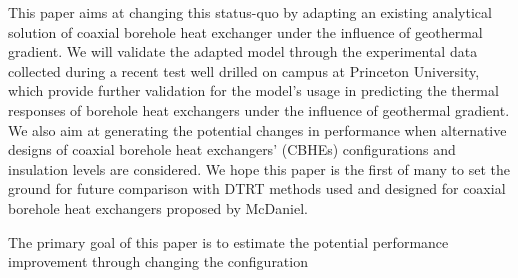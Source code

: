 This paper aims at changing this status-quo by adapting an existing analytical solution of coaxial borehole heat exchanger under the influence of geothermal gradient. We will validate the adapted model through the experimental data collected during a recent test well drilled on campus at Princeton University, which provide further validation for the model's usage in predicting the thermal responses of borehole heat exchangers under the influence of geothermal gradient. %
We also aim at generating the potential changes in performance when alternative designs of coaxial borehole heat exchangers' (CBHEs) configurations and insulation levels are considered. We hope this paper is the first of many to set the ground for future comparison with DTRT methods used and designed for coaxial borehole heat exchangers proposed by McDaniel. 

The primary goal of this paper is to estimate the potential performance improvement through changing the configuration 


